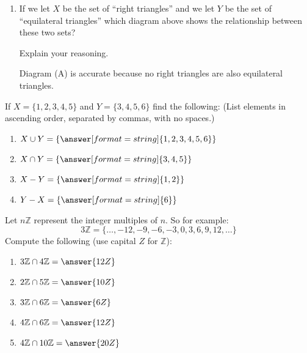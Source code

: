 \documentclass[nooutcomes]{ximera}
\begin{document}
\begin{problem}
\begin{enumerate}
\item If we let $X$ be the set of ``right triangles'' and we let $Y$ be the set of ``equilateral triangles'' which diagram above shows the relationship between these two sets?
\begin{multipleChoice}
\end{multipleChoice}

Explain your reasoning.
\begin{freeResponse}
\begin{hint}
Diagram (A) is accurate because no right triangles are also equilateral triangles.  
\end{hint}
\end{freeResponse}
\end{enumerate}
\end{problem}


\begin{problem}
If $X = \{1,2,3,4,5\}$ and $Y = \{3,4,5,6\}$ find the following: (List elements in ascending order, separated by commas, with no spaces.)
\begin{enumerate}
\item $X\cup Y = \{\answer[format=string]{1,2,3,4,5,6}\}$
\item $X\cap Y = \{\answer[format=string]{3,4,5}\}$
\item $X-Y = \{\answer[format=string]{1,2}\}$
\item $Y-X = \{\answer[format=string]{6}\}$
\end{enumerate}
\end{problem}

\begin{problem}
Let $n\mathbb Z$ represent the integer multiples of $n$. So for example:
\[
3\mathbb Z = \{\dots,-12,-9,-6,-3,0,3,6,9,12,\dots\}
\]
Compute the following (use capital $Z$ for $\mathbb Z$):
\begin{enumerate}
\item $3\mathbb Z\cap 4\mathbb Z = \answer{12Z}$ 
\item $2\mathbb Z\cap 5\mathbb Z = \answer{10Z}$
\item $3\mathbb Z\cap 6\mathbb Z = \answer{6Z}$
\item $4\mathbb Z\cap 6\mathbb Z = \answer{12Z}$
\item $4\mathbb Z\cap 10\mathbb Z = \answer{20Z}$
\end{enumerate}
\end{problem}
\end{document}
